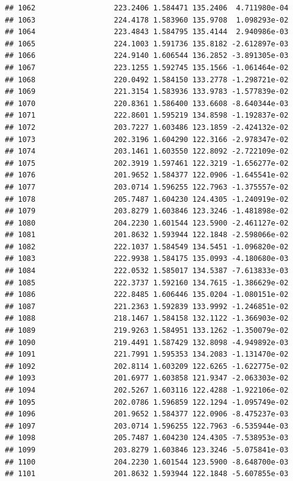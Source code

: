 \documentclass[
]{article}
\begin{document}
\begin{verbatim}
## 1062                  223.2406 1.584471 135.2406  4.711980e-04
## 1063                  224.4178 1.583960 135.9708  1.098293e-02
## 1064                  223.4843 1.584795 135.4144  2.940986e-03
## 1065                  224.1003 1.591736 135.8182 -2.612897e-03
## 1066                  224.9140 1.606544 136.2852 -3.891305e-03
## 1067                  223.1255 1.592745 135.1566 -1.061464e-02
## 1068                  220.0492 1.584150 133.2778 -1.298721e-02
## 1069                  221.3154 1.583936 133.9783 -1.577839e-02
## 1070                  220.8361 1.586400 133.6608 -8.640344e-03
## 1071                  222.8601 1.595219 134.8598 -1.192837e-02
## 1072                  203.7227 1.603486 123.1859 -2.424132e-02
## 1073                  202.3196 1.604290 122.3166 -2.978347e-02
## 1074                  203.1461 1.603550 122.8092 -2.722109e-02
## 1075                  202.3919 1.597461 122.3219 -1.656277e-02
## 1076                  201.9652 1.584377 122.0906 -1.645541e-02
## 1077                  203.0714 1.596255 122.7963 -1.375557e-02
## 1078                  205.7487 1.604230 124.4305 -1.240919e-02
## 1079                  203.8279 1.603846 123.3246 -1.481898e-02
## 1080                  204.2230 1.601544 123.5900 -2.461127e-02
## 1081                  201.8632 1.593944 122.1848 -2.598066e-02
## 1082                  222.1037 1.584549 134.5451 -1.096820e-02
## 1083                  222.9938 1.584175 135.0993 -4.180680e-03
## 1084                  222.0532 1.585017 134.5387 -7.613833e-03
## 1085                  222.3737 1.592160 134.7615 -1.386629e-02
## 1086                  222.8485 1.606446 135.0204 -1.080151e-02
## 1087                  221.2363 1.592839 133.9992 -1.246851e-02
## 1088                  218.1467 1.584158 132.1122 -1.366903e-02
## 1089                  219.9263 1.584951 133.1262 -1.350079e-02
## 1090                  219.4491 1.587429 132.8098 -4.949892e-03
## 1091                  221.7991 1.595353 134.2083 -1.131470e-02
## 1092                  202.8114 1.603209 122.6265 -1.622775e-02
## 1093                  201.6977 1.603858 121.9347 -2.063303e-02
## 1094                  202.5267 1.603116 122.4288 -1.922106e-02
## 1095                  202.0786 1.596859 122.1294 -1.095749e-02
## 1096                  201.9652 1.584377 122.0906 -8.475237e-03
## 1097                  203.0714 1.596255 122.7963 -6.535944e-03
## 1098                  205.7487 1.604230 124.4305 -7.538953e-03
## 1099                  203.8279 1.603846 123.3246 -5.075841e-03
## 1100                  204.2230 1.601544 123.5900 -8.648700e-03
## 1101                  201.8632 1.593944 122.1848 -5.607855e-03

\end{verbatim}
\end{document}
